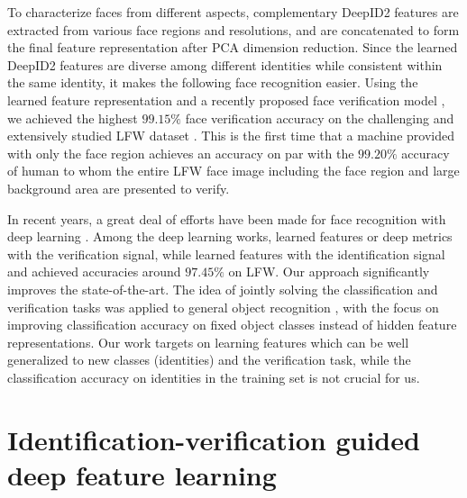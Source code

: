 \documentclass{article} %
\begin{document}
To characterize faces from different aspects, complementary DeepID2 features are extracted from various face regions and resolutions, and are concatenated to form the final feature representation after PCA dimension reduction. Since the learned DeepID2 features are diverse among different identities while consistent within the same identity, it makes the following face recognition easier. Using the learned feature representation and a recently proposed face verification model \cite{chen2012}, we achieved the highest $\bm{99.15\%}$ face verification accuracy on the challenging and extensively studied LFW dataset \cite{huang2007}. This is the first time that a machine provided with only the face region achieves an accuracy on par with the $99.20\%$ accuracy of human to whom the entire LFW face image including the face region and large background area are presented to verify.

In recent years, a great deal of efforts have been made for face recognition with deep learning \cite{chopra2005,huang2012,sun2013b,zhu2013,hu2014,taigman2014,sun2014}. Among the deep learning works, \cite{chopra2005,sun2013b,hu2014} learned features or deep metrics with the verification signal, while \cite{taigman2014,sun2014} learned features with the identification signal and achieved accuracies around $97.45\%$ on LFW. Our approach significantly improves the state-of-the-art. The idea of jointly solving the classification and verification tasks was applied to general object recognition \cite{mobahi2009}, with the focus on improving classification accuracy on fixed object classes instead of hidden feature representations. Our work targets on learning features which can be well generalized to new classes (identities) and the verification task, while the classification accuracy on identities in the training set is not crucial for us.


\section{Identification-verification guided deep feature learning}
\label{sec:deepiv}
\end{document}
